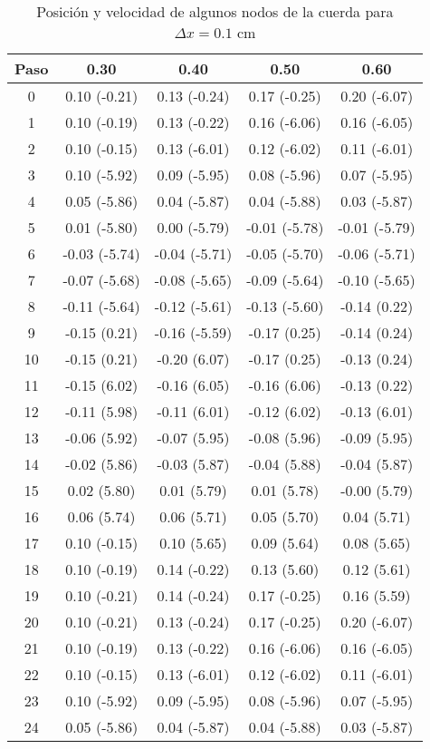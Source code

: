 \documentclass[11pt]{article}
\begin{document}
\begin{table}[t]
\center
\begin{small}
\begin{tabular}{ c c c c c }
\hline
Paso & 0.30 & 0.40 & 0.50 & 0.60 \\
\hline
\hline
0 & 0.10 (-0.21) & 0.13 (-0.24) & 0.17 (-0.25) & 0.20 (-6.07) \\
1 & 0.10 (-0.19) & 0.13 (-0.22) & 0.16 (-6.06) & 0.16 (-6.05) \\
2 & 0.10 (-0.15) & 0.13 (-6.01) & 0.12 (-6.02) & 0.11 (-6.01) \\
3 & 0.10 (-5.92) & 0.09 (-5.95) & 0.08 (-5.96) & 0.07 (-5.95) \\
4 & 0.05 (-5.86) & 0.04 (-5.87) & 0.04 (-5.88) & 0.03 (-5.87) \\
5 & 0.01 (-5.80) & 0.00 (-5.79) & -0.01 (-5.78) & -0.01 (-5.79) \\
6 & -0.03 (-5.74) & -0.04 (-5.71) & -0.05 (-5.70) & -0.06 (-5.71) \\
7 & -0.07 (-5.68) & -0.08 (-5.65) & -0.09 (-5.64) & -0.10 (-5.65) \\
8 & -0.11 (-5.64) & -0.12 (-5.61) & -0.13 (-5.60) & -0.14 (0.22) \\
9 & -0.15 (0.21) & -0.16 (-5.59) & -0.17 (0.25) & -0.14 (0.24) \\
10 & -0.15 (0.21) & -0.20 (6.07) & -0.17 (0.25) & -0.13 (0.24) \\
11 & -0.15 (6.02) & -0.16 (6.05) & -0.16 (6.06) & -0.13 (0.22) \\
12 & -0.11 (5.98) & -0.11 (6.01) & -0.12 (6.02) & -0.13 (6.01) \\
13 & -0.06 (5.92) & -0.07 (5.95) & -0.08 (5.96) & -0.09 (5.95) \\
14 & -0.02 (5.86) & -0.03 (5.87) & -0.04 (5.88) & -0.04 (5.87) \\
15 & 0.02 (5.80) & 0.01 (5.79) & 0.01 (5.78) & -0.00 (5.79) \\
16 & 0.06 (5.74) & 0.06 (5.71) & 0.05 (5.70) & 0.04 (5.71) \\
17 & 0.10 (-0.15) & 0.10 (5.65) & 0.09 (5.64) & 0.08 (5.65) \\
18 & 0.10 (-0.19) & 0.14 (-0.22) & 0.13 (5.60) & 0.12 (5.61) \\
19 & 0.10 (-0.21) & 0.14 (-0.24) & 0.17 (-0.25) & 0.16 (5.59) \\
\hline
20 & 0.10 (-0.21) & 0.13 (-0.24) & 0.17 (-0.25) & 0.20 (-6.07) \\
\hline
21 & 0.10 (-0.19) & 0.13 (-0.22) & 0.16 (-6.06) & 0.16 (-6.05) \\
22 & 0.10 (-0.15) & 0.13 (-6.01) & 0.12 (-6.02) & 0.11 (-6.01) \\
23 & 0.10 (-5.92) & 0.09 (-5.95) & 0.08 (-5.96) & 0.07 (-5.95) \\
24 & 0.05 (-5.86) & 0.04 (-5.87) & 0.04 (-5.88) & 0.03 (-5.87) \\
\end{tabular}
\end{small}
\caption{Posición y velocidad de algunos nodos de la cuerda para $\Delta{x} = 0.1$ cm }
\label{tab:est_velocidad}
\end{table}
\end{document}
